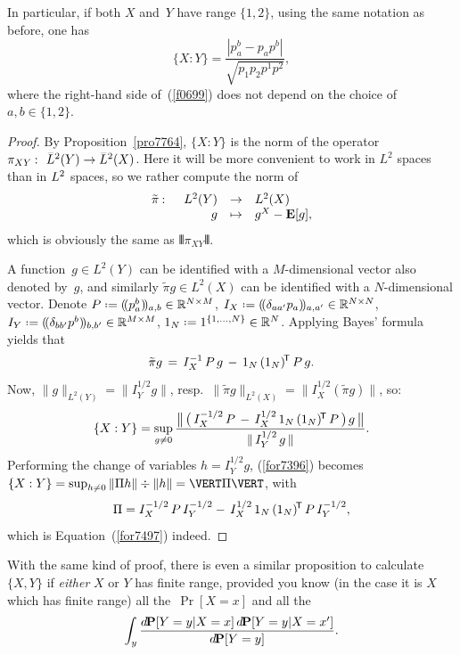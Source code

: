 \begin{Rmk}\label{rmk9549}
In particular, if both $X$ and~$Y$ have range $\{1,2\}$,
using the same notation as before, one has
\[\label{f0699} \{X:Y\} = \frac{|p_a^b-p_ap^b|}{\sqrt{p_1p_2p^1p^2}} ,\]
where the right-hand side of~(\ref{f0699}) does not depend on the choice of
$a,b \in \{1,2\}$.
\end{Rmk}

\begingroup{}\begin{proof}
By Proposition~\ref{pro7764}, ${\{X:Y\}}$ is the norm of the operator
$\pi_{XY} \colon \ldb(Y) \to \ldb(X)$.
Here it will be more convenient to work in $L^2$ spaces than in $\ldb$ spaces,
so we rather compute the norm of
\[ \begin{array}{rrcl} \tilde{\pi} \colon & L^2(Y) & \to & L^2(X) \\
& g & \mapsto & g^X - \EE[g] , \end{array} \]
which is obviously the same as $\VERT\pi_{XY}\VERT$.

A function~$g\in L^2(Y)$ can be identified with a $M$-dimensional vector also denoted by~$g$,
and similarly $\tilde{\pi}g \in L^2(X)$ can be identified with a $N$-dimensional vector.
Denote $P \coloneqq (\!( p_a^b )\!)_{a,b} \ab \in \RR^{N\times M}$,
$I_X \coloneqq (\!( \delta_{aa'} p_a )\!)_{a,a'} \ab \in \RR^{N\times N}$,
$I_Y \coloneqq (\!( \delta_{bb'} p^b )\!)_{b,b'} \ab \in \RR^{M\times M}$,
$1_N \coloneqq 1^{\{1,\ldots,N\}} \ab \in \RR^N$.
%
Applying Bayes' formula yields that
\[ \tilde{\pi} g \, = \, I_X^{-1} \, P \, g \, - \, 1_N \, \T{(1_N)} \, P \, g .\]
Now, $\|g\|_{L^2(Y)} = \| I_{Y}^{1/2} g \|$, resp.\ 
$\|\tilde{\pi} g\|_{L^2(X)} = \| I_{X}^{1/2} (\tilde{\pi}g) \|$, so:
\[\label{for7396} \{X:Y\} = \sup_{g\neq 0} \frac{
\big\| \, \big( \, I_X^{-1/2} \, P \, - \, I_X^{1/2} \, 1_N \, \T{(1_N)} \, P \, \big) \, g \, \big\|}
{\| \, I_{Y}^{1/2} \, g \, \|} .\]
Performing the change of variables $h = I_{Y}^{1/2} g$, (\ref{for7396}) becomes
$\{ X:Y \} = \sup_{h\neq 0} \ab  \|\Pi h\| \div \|h\| = \VERT \Pi \VERT$,
with
\[ \Pi = I_X^{-1/2} \, P \, I_Y^{-1/2} - \, I_X^{1/2} \, 1_N \, (1_N)^{\mathsf{\!T}} \, P \, I_Y^{-1/2} ,\]
which is Equation~(\ref{for7497}) indeed.
\end{proof}\endgroup

\begin{Rmk}
With the same kind of proof, there is even a similar proposition to calculate $\{X,Y\}$
if \emph{either} $X$ or $Y$ has finite range,
provided you know (in the case it is $X$ which has finite range)
all the~$\Pr[X=x]$ and all the
\[ \int_y \frac{\dx\Pr[Y=y|X=x]\,\dx\Pr[Y=y|X=x']}{\dx\Pr[Y=y]} .\]
\end{Rmk}

